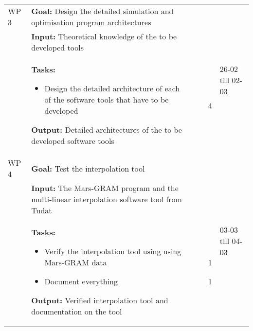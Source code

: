 \begin{longtable}{|p{2cm}|p{10cm}|p{1cm}|p{1cm}|}

WP 3 & \textbf{Goal:} Design the detailed simulation and optimisation program architectures &  & \multirow{3}{1cm}{26-02 till 02-03}  \\ 
&\textbf{Input:} Theoretical knowledge of the to be developed tools & & \\
& \textbf{Tasks:}
\begin{itemize}
\item Design the detailed architecture of each of the software tools that have to be developed
\end{itemize} 
\textbf{Output:} Detailed architectures of the to be developed software tools & \noindent \begin{itemize}[leftmargin=*]
\item[4] 
\end{itemize} & \\ \hline



WP 4 & \textbf{Goal:} Test the interpolation tool &  & \multirow{3}{1cm}{03-03 till 04-03}  \\ 
&\textbf{Input:} The Mars-\ac{GRAM} program and the multi-linear interpolation software tool from Tudat & & \\
& \textbf{Tasks:}
\begin{itemize}
\item Verify the interpolation tool using using Mars-\ac{GRAM} data
\item Document everything
\end{itemize} 
\textbf{Output:} Verified interpolation tool and documentation on the tool & \noindent \begin{itemize}[leftmargin=*]
\item[1] 
\item[1]
\end{itemize} & \\ \hline



\end{longtable}
